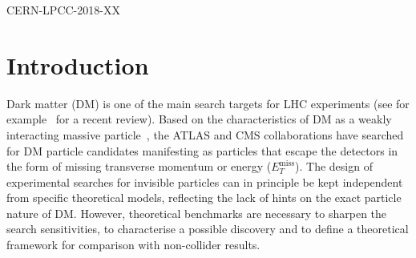 \documentclass[a4paper, 11pt,notoc]{article}
\newcommand{\MET}{\ensuremath{E_T^\mathrm{miss}}\xspace}
\begin{document}










\hfill CERN-LPCC-2018-XX


\maketitle


\section{Introduction}
\label{sec:introduction}

Dark matter (DM) is one of the main search targets for LHC experiments (see for example~\cite{Kahlhoefer:2017dnp} for a recent review). Based on the characteristics of DM as a weakly interacting massive particle~\cite{Bertone:2004pz}, the ATLAS and CMS collaborations have searched for DM particle candidates manifesting as particles that escape the detectors in the form of missing transverse momentum or energy ($\MET$). The design of experimental searches for invisible particles can in principle be kept independent from specific theoretical models, reflecting the lack of hints on the exact particle nature of DM. However, theoretical benchmarks are necessary to sharpen the search sensitivities, to characterise a possible discovery and to define a theoretical framework for comparison with non-collider results. 
\end{document}
